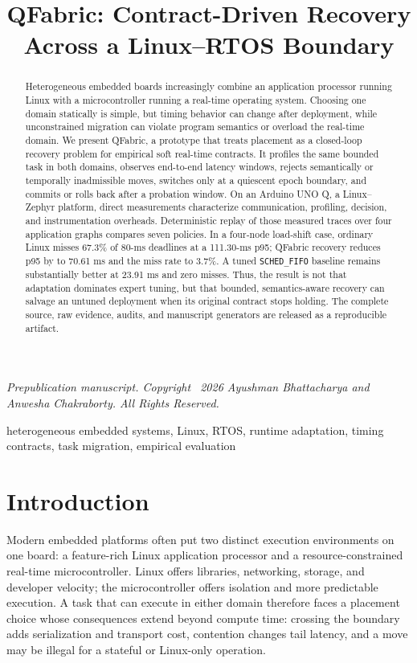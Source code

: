 \documentclass[conference]{IEEEtran}
\title{QFabric: Contract-Driven Recovery Across a Linux--RTOS Boundary}
\author{\IEEEauthorblockN{Ayushman Bhattacharya}
\IEEEauthorblockA{\href{mailto:ayushman@myceli.ai}{ayushman@myceli.ai}}
\and
\IEEEauthorblockN{Anwesha Chakraborty}
\IEEEauthorblockA{\href{mailto:anwesha.elixpo@gmail.com}{anwesha.elixpo@gmail.com}}}
\newcommand{\system}{QFabric\xspace}
\begin{document}
\maketitle

\begin{center}
\footnotesize\textit{Prepublication manuscript. Copyright \textcopyright\ 2026
Ayushman Bhattacharya and Anwesha Chakraborty. All Rights Reserved.}
\end{center}

\begin{abstract}
Heterogeneous embedded boards increasingly combine an application processor
running Linux with a microcontroller running a real-time operating system.
Choosing one domain statically is simple, but timing behavior can change after
deployment, while unconstrained migration can violate program semantics or
overload the real-time domain. We present \system, a prototype that treats
placement as a closed-loop recovery problem for empirical soft real-time
contracts. It profiles the same bounded task in both domains, observes
end-to-end latency windows, rejects semantically or temporally inadmissible
moves, switches only at a quiescent epoch boundary, and commits or rolls back
after a probation window. On an Arduino UNO Q, a Linux--Zephyr platform, direct
measurements characterize communication, profiling, decision, and
instrumentation overheads. Deterministic replay of those measured traces over
four application graphs compares seven policies. In a four-node load-shift
case, ordinary Linux misses 67.3\% of 80-ms deadlines at a 111.30-ms p95;
\system recovery reduces p95 by \RecoveryImprovement to 70.61 ms and the miss
rate to 3.7\%. A tuned \texttt{SCHED\_FIFO} baseline remains substantially
better at 23.91 ms and zero misses. Thus, the result is not that adaptation
dominates expert tuning, but that bounded, semantics-aware recovery can salvage
an untuned deployment when its original contract stops holding. The complete
source, raw evidence, audits, and manuscript generators are released as a
reproducible artifact.
\end{abstract}

\begin{IEEEkeywords}
heterogeneous embedded systems, Linux, RTOS, runtime adaptation, timing
contracts, task migration, empirical evaluation
\end{IEEEkeywords}

\section{Introduction}
Modern embedded platforms often put two distinct execution environments on one
board: a feature-rich Linux application processor and a resource-constrained
real-time microcontroller. Linux offers libraries, networking, storage, and
developer velocity; the microcontroller offers isolation and more predictable
execution. A task that can execute in either domain therefore faces a placement
choice whose consequences extend beyond compute time: crossing the boundary
adds serialization and transport cost, contention changes tail latency, and a
move may be illegal for a stateful or Linux-only operation.
\end{document}
